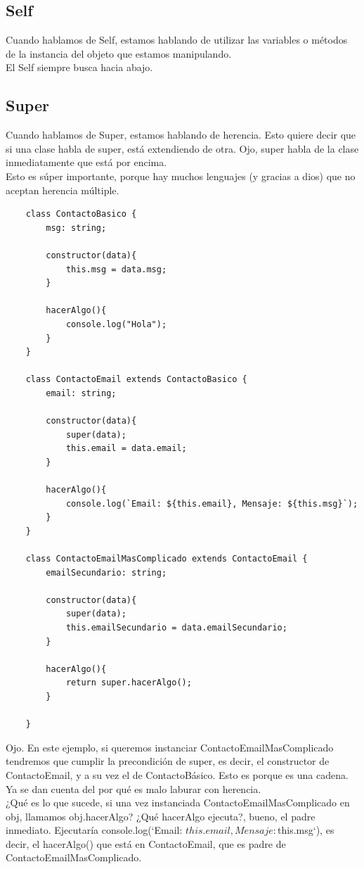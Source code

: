 \documentclass[10pt,a4paper]{article}
\begin{document}
\subsection*{Self}
Cuando hablamos de Self, estamos hablando de utilizar las variables o métodos de la instancia del objeto que estamos manipulando. \\
El Self siempre busca hacia abajo. 
\subsection*{Super}
Cuando hablamos de Super, estamos hablando de herencia. Esto quiere decir que si una clase habla de super, está extendiendo de otra. Ojo, super habla de la clase inmediatamente que está por encima. \\
Esto es súper importante, porque hay muchos lenguajes (y gracias a dios) que no aceptan herencia múltiple. 
\begin{lstlisting}
    class ContactoBasico {
        msg: string;

        constructor(data){
            this.msg = data.msg;
        }

        hacerAlgo(){
            console.log("Hola");
        }
    }

    class ContactoEmail extends ContactoBasico {
        email: string;

        constructor(data){
            super(data);
            this.email = data.email;
        }

        hacerAlgo(){
            console.log(`Email: ${this.email}, Mensaje: ${this.msg}`);
        }
    }

    class ContactoEmailMasComplicado extends ContactoEmail {
        emailSecundario: string; 

        constructor(data){
            super(data);
            this.emailSecundario = data.emailSecundario;
        }

        hacerAlgo(){
            return super.hacerAlgo();
        }

    }
\end{lstlisting}
Ojo. En este ejemplo, si queremos instanciar ContactoEmailMasComplicado tendremos que cumplir la precondición de super, es decir, el constructor de ContactoEmail, y a su vez el de ContactoBásico. Esto es porque es una cadena. Ya se dan cuenta del por qué es malo laburar con herencia. \\
¿Qué es lo que sucede, si una vez instanciada ContactoEmailMasComplicado en obj, llamamos obj.hacerAlgo? ¿Qué hacerAlgo ejecuta?, bueno, el padre inmediato. Ejecutaría  console.log(`Email: ${this.email}, Mensaje: ${this.msg}`), es decir, el hacerAlgo() que está en ContactoEmail, que es padre de ContactoEmailMasComplicado. 
\end{document}
